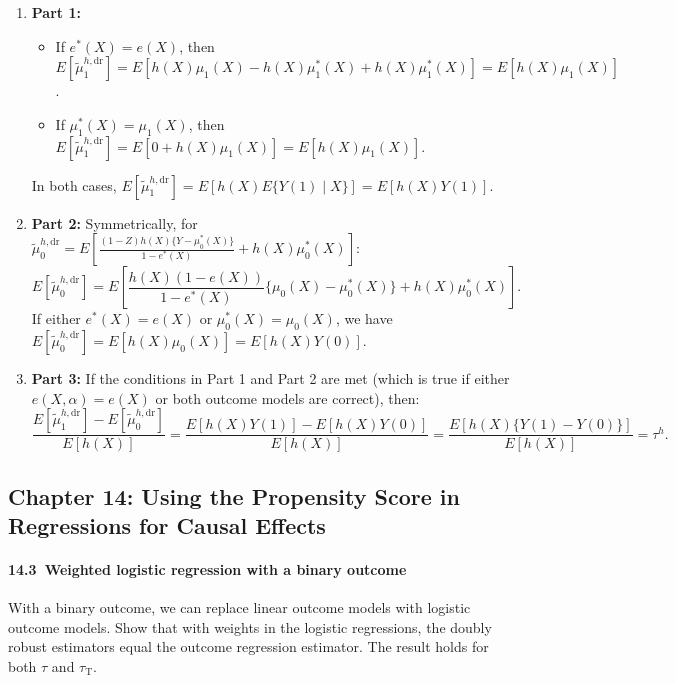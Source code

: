 \documentclass[krantz1]{krantz}
\def\Paragraph{\paragraph}
\begin{document}
\begin{enumerate}
    \item \textbf{Part 1:} 
    \begin{itemize}
        \item If $e^*(X) = e(X)$, then $E[\tilde{\mu}_1^{h,\mathrm{dr}}] = E[ h(X)\mu_1(X) - h(X)\mu_1^*(X) + h(X)\mu_1^*(X) ] = E[h(X)\mu_1(X)]$.
        \item If $\mu_1^*(X) = \mu_1(X)$, then $E[\tilde{\mu}_1^{h,\mathrm{dr}}] = E[ 0 + h(X)\mu_1(X) ] = E[h(X)\mu_1(X)]$.
    \end{itemize}
    In both cases, $E[\tilde{\mu}_1^{h,\mathrm{dr}}] = E[h(X)E\{Y(1)\mid X\}] = E[h(X)Y(1)]$.

    \item \textbf{Part 2:}
    Symmetrically, for $\tilde{\mu}_0^{h,\mathrm{dr}} = E\left[ \frac{(1-Z)h(X)\{Y - \mu_0^*(X)\}}{1 - e^*(X)} + h(X)\mu_0^*(X) \right]$:
    \begin{equation*}
        E[\tilde{\mu}_0^{h,\mathrm{dr}}] = E\left[ \frac{h(X)(1-e(X))}{1-e^*(X)} \{ \mu_0(X) - \mu_0^*(X) \} + h(X)\mu_0^*(X) \right].
    \end{equation*}
    If either $e^*(X) = e(X)$ or $\mu_0^*(X) = \mu_0(X)$, we have $E[\tilde{\mu}_0^{h,\mathrm{dr}}] = E[h(X)\mu_0(X)] = E[h(X)Y(0)]$.

    \item \textbf{Part 3:}
    If the conditions in Part 1 and Part 2 are met (which is true if either $e(X, \alpha) = e(X)$ or both outcome models are correct), then:
    \begin{equation*}
        \frac{E[\tilde{\mu}_1^{h,\mathrm{dr}}] - E[\tilde{\mu}_0^{h,\mathrm{dr}}]}{E[h(X)]} = \frac{E[h(X)Y(1)] - E[h(X)Y(0)]}{E[h(X)]} = \frac{E[h(X)\{Y(1)-Y(0)\}]}{E[h(X)]} = \tau^h.
    \end{equation*}
\end{enumerate}

\subsection{Chapter 14: Using the Propensity Score in Regressions for Causal Effects}

 \Paragraph{14.3~Weighted logistic regression with a binary outcome}\label{hw::logistic-regression}

With a binary outcome, we can replace linear outcome models with logistic outcome models. Show that with weights in the logistic regressions, the doubly robust estimators equal the outcome regression estimator. The result holds for both $\tau$ and $\tau_\mathrm{T}$.
\end{document}
